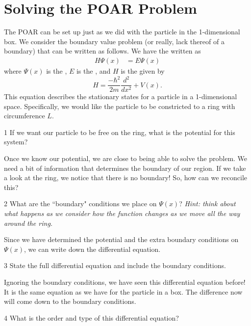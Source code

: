 \documentclass{article}
\begin{document}
\section{Solving the POAR Problem}
The POAR can be set up just as we did with the particle in the 1-dimensional box.  We consider the boundary value problem (or really, lack thereof of a boundary) that can be written as follows. We have the  written as
\begin{align*}
    H\Psi(x) &= E \Psi(x)
\end{align*}
where $\Psi(x)$ is the , $E$ is the , and $H$ is the  given by
\[
H= \frac{-\hbar^2}{2m}\frac{d^2}{dx^2} + V(x).
\]
This equation describes the stationary states for a particle in a 1-dimensional space. Specifically, we would like the particle to be constricted to a ring with circumference $L$.
\begin{problem}{}{1}
If we want our particle to be free on the ring, what is the potential for this system?
\end{problem}
\noindent Once we know our potential, we are close to being able to solve the problem.  We need a bit of information that determines the boundary of our region. If we take a look at the ring, we notice that there is no boundary! So, how can we reconcile this?
\begin{problem}{}{2}
What are the ``boundary" conditions we place on $\Psi(x)$? \emph{Hint: think about what happens as we consider how the function changes as we move all the way around the ring.}
\end{problem}

Since we have determined the potential and the extra boundary conditions on $\Psi(x)$, we can write down the differential equation.

\begin{problem}{}{3}
State the full differential equation and include the boundary conditions.
\end{problem}

\noindent Ignoring the boundary conditions, we have seen this differential equation before! It is the same equation as we have for the particle in a box.  The difference now will come down to the boundary conditions.

\begin{problem}{}{4}
What is the order and type of this differential equation?
\end{problem}
\end{document}
